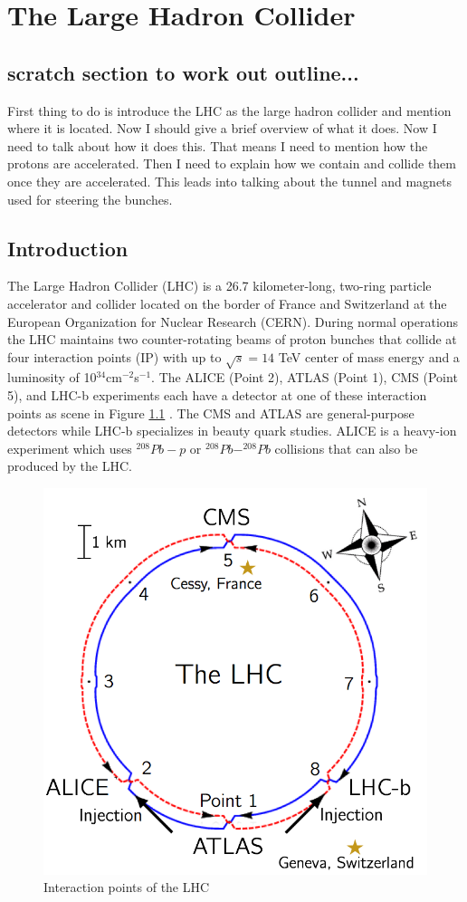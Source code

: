 \chapter{The Large Hadron Collider}

\section{scratch section to work out outline...}
First thing to do is introduce the LHC as the large hadron collider and mention where it is located.  Now I should give a brief overview of what it does.  Now I need to talk about how it does this.  That means I need to mention how the protons are accelerated.  Then I need to explain how we contain and collide them once they are accelerated.  This leads into talking about the tunnel and magnets used for steering the bunches.

\section{Introduction}
The Large Hadron Collider (LHC) is a 26.7 kilometer-long, two-ring particle accelerator and collider located on the border of France and Switzerland at the European Organization for Nuclear Research (CERN).  During normal operations the LHC maintains two counter-rotating beams of proton bunches that collide at four interaction points (IP) with up to $\sqrt{s}=14$ TeV center of mass energy and a luminosity of 10$^{34}$cm$^{-2}$s$^{-1}$.  The ALICE (Point 2), ATLAS (Point 1), CMS (Point 5), and LHC-b experiments each have a detector at one of these interaction points as scene in Figure \ref{fig:lhcips} .  The CMS and ATLAS are general-purpose detectors while LHC-b specializes in beauty quark studies.  ALICE is a heavy-ion experiment which uses $^{208}Pb-p$ or $^{208}Pb-^{208}Pb$ collisions that can also be produced by the LHC.

\begin{figure}[h]
	\centering
	\includegraphics[width=0.7\linewidth]{Figures/LHC_IPs}
	\caption[LHC interaction points]{Interaction points of the LHC}
	\label{fig:lhcips}
\end{figure}


